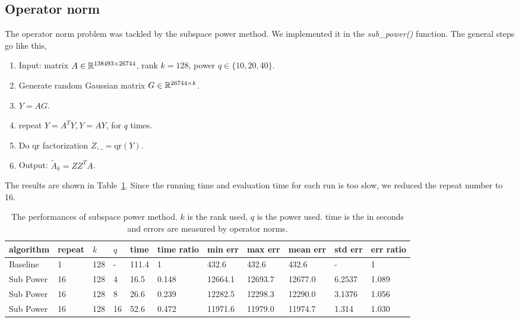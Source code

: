 \subsection{Operator norm}
The operator norm problem was tackled by the subspace power method.
We implemented it in the \textit{sub\_power()} function.
The general steps go like this,
\begin{enumerate}
    \item Input: matrix $A\in {\mathbb{R}}^{138493\times 26744}$,
    rank $k=128$, power $q\in\{10,20,40\}$.
    \item Generate random Gaussian matrix $G\in{\mathbb{R}}^{26744\times k}$.
    \item $Y=AG$.
    \item repeat $Y = A^T Y, Y=AY$, for $q$ times.\
    \item Do qr factorization $Z, \_ = \text{qr}(Y)$.
    \item Output: $\tilde{A}_k = Z Z^T A$.
\end{enumerate}

The results are shown in Table~\ref{tab:op}.
Since the running time and evaluation time for each run is too slow,
we reduced the repeat number to 16.

\begin{table}[htb]
  \setlength{\tabcolsep}{2.6pt}
  \caption{The performances of subspace power method.
  $k$ is the rank used, $q$ is the power used.
  time is the in seconds and
  errors are measured by operator norms.
    }
  \label{tab:op}
  \centering
  {\small
  \begin{tabular}{lllllllllll}
    \toprule
    algorithm & repeat & $k$ & $q$ & time & time ratio & min err & max err & mean err & std err & err ratio \\
    \midrule
    Baseline & 1 & 128 & - & 111.4 & 1 & 432.6 & 432.6 & 432.6 & - & 1 \\
    Sub Power & 16 & 128 & 4 & 16.5 & 0.148 & 12664.1 & 12693.7 & 12677.0 & 6.2537 & 1.089 \\
    Sub Power & 16 & 128 & 8 & 26.6 & 0.239 & 12282.5 & 12298.3 & 12290.0 & 3.1376 & 1.056 \\
    Sub Power & 16 & 128 & 16 & 52.6 & 0.472 & 11971.6 & 11979.0 & 11974.7 & 1.314 & 1.030 \\
    \bottomrule
  \end{tabular}
  }
\end{table}
